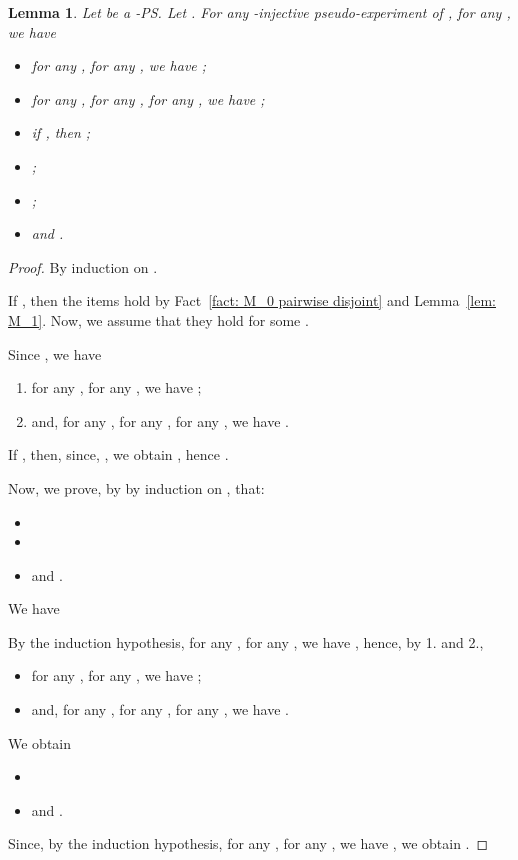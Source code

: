 \documentclass{article}
\theoremstyle{plain}
\newtheorem{lem}[theorem]{Lemma}
\begin{document}
\begin{lem}\label{lemma: M_j(e)}
Let  be a -PS. 
Let . 
For any -injective pseudo-experiment  of , for any , we have 
\begin{itemize}
\item for any , for any , we have ;
\item for any , for any , for any , we have ;
\item if , then ;
\item ;
\item ;
\item and .
\end{itemize}
\end{lem}

\begin{proof}
By induction on . 

If , then the items hold by Fact~\ref{fact: M_0 pairwise disjoint} and Lemma~\ref{lem: M_1}. Now, we assume that they hold for some .

Since , we have 
\begin{enumerate}
\item for any , for any , we have ;
\item and, for any , for any , for any , we have .
\end{enumerate}
If , then, since, , 
we obtain , hence .

Now, we prove, by by induction on , that:
\begin{itemize}
\item 
\item 
\item and .
\end{itemize}
We have

By the induction hypothesis, for any , for any , we have , hence, by 1. and 2., 
\begin{itemize}
\item for any , for any , we have ;
\item and, for any , for any , for any , we have .
\end{itemize}
We obtain 
\begin{itemize}
\item 
\item and .
\end{itemize}
Since, by the induction hypothesis, for any , for any , we have , we obtain .
\end{proof}

\begin{comment}
\begin{cor}\label{cor: M_i}
Let  be a -PS. Let . Let  be a -injective pseudo-experiment of . Let . Then, for any , for any , we have .
\end{cor}

\begin{proof}
In the case , notice that whenever , we have .
\end{proof}
\end{comment}
\end{document}
